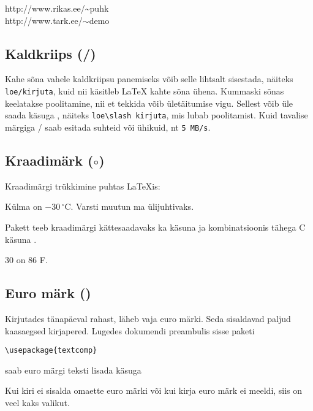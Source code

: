 \begin{example}
http://www.rikas.ee/\~{}puhk \\
http://www.tark.ee/$\sim$demo
\end{example}

\subsection{Kaldkriips (/)}
Kahe sõna vahele kaldkriipsu panemiseks võib selle lihtsalt sisestada,
näiteks \texttt{loe/kirjuta}, kuid nii käsitleb \LaTeX{} kahte sõna
ühena. Kummaski sõnas keelatakse poolitamine, nii et tekkida võib
ületäitumise vigu. Sellest võib üle saada käsuga , näiteks
\verb|loe\slash kirjuta|, mis lubab poolitamist. Kuid
tavalise märgiga / saab esitada suhteid või ühikuid, nt
\texttt{5 MB/s}.

\subsection{Kraadimärk \texorpdfstring{($\circ$)}{}}

Kraadimärgi trükkimine puhtas \LaTeX is:
\begin{example}
Külma on $-30\,^{\circ}\mathrm{C}$.
Varsti muutun ma ülijuhtivaks.
\end{example}

Pakett  teeb kraadimärgi kättesaadavaks ka käsuna
 ja kombinatsioonis tähega C käsuna .

\begin{example}
30 \textcelsius{} on
86 \textdegree{}F.
\end{example}

\subsection{Euro märk \texorpdfstring{(\officialeuro)}{}}

Kirjutades tänapäeval rahast, läheb vaja euro märki.
Seda sisaldavad paljud kaasaegsed kirjapered. Lugedes dokumendi
preambulis sisse paketi 
\begin{lscommand}
\verb|\usepackage{textcomp}|
\end{lscommand}
\noindent saab euro märgi teksti lisada käsuga
\begin{lscommand}
\end{lscommand}

Kui kiri ei sisalda omaette euro märki või kui kirja euro märk ei
meeldi, siis on veel kaks valikut.

